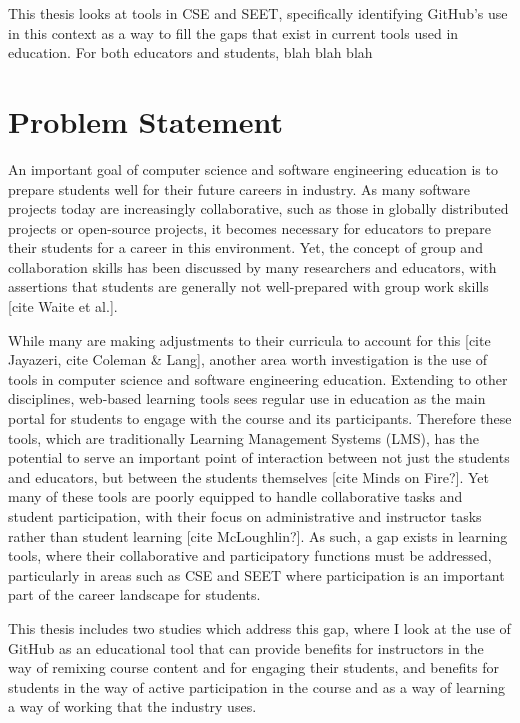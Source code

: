 This thesis looks at tools in CSE and SEET, specifically identifying GitHub's use in this context as a way to fill the gaps that exist in current tools used in education. For both educators and students, blah blah blah %


\section{Problem Statement}
An important goal of computer science and software engineering education is to prepare students well for their future careers in industry. As many software projects today are increasingly collaborative, such as those in globally distributed projects or open-source projects, it becomes necessary for educators to prepare their students for a career in this environment. Yet, the concept of group and collaboration skills has been discussed by many researchers and educators, with assertions that students are generally not well-prepared with group work skills [cite Waite et al.].

While many are making adjustments to their curricula to account for this [cite Jayazeri, cite Coleman & Lang], another area worth investigation is the use of tools in computer science and software engineering education. Extending to other disciplines, web-based learning tools sees regular use in education as the main portal for students to engage with the course and its participants. Therefore these tools, which are traditionally Learning Management Systems (LMS), has the potential to serve an important point of interaction between not just the students and educators, but between the students themselves [cite Minds on Fire?]. Yet many of these tools are poorly equipped to handle collaborative tasks and student participation, with their focus on administrative and instructor tasks rather than student learning [cite McLoughlin?]. As such, a gap exists in learning tools, where their collaborative and participatory functions must be addressed, particularly in areas such as CSE and SEET where participation is an important part of the career landscape for students.

This thesis includes two studies which address this gap, where I look at the use of GitHub as an educational tool that can provide benefits for instructors in the way of remixing course content and for engaging their students, and benefits for students in the way of active participation in the course and as a way of learning a way of working that the industry uses. %

